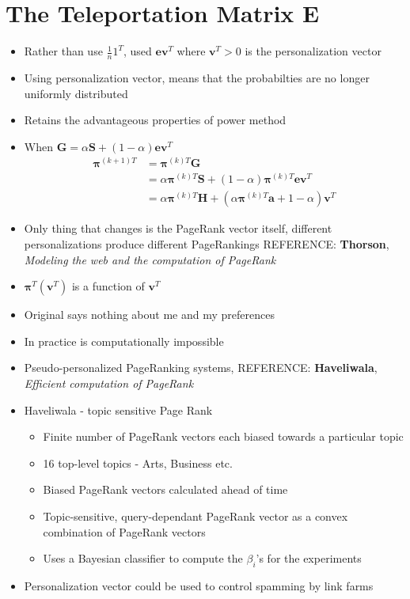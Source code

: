 \documentclass[11pt]{report}
\begin{document}
\section{The Teleportation Matrix E}
\begin{itemize}
\item Rather than use $\frac{1}{n}1^T$, used $\textbf{ev}^T$ where $\textbf{v}^T >0$ is the personalization vector
\item Using personalization vector, means that the probabilties are no longer uniformly distributed
\item Retains the advantageous properties of power method
\item When $\textbf{G} = \alpha\textbf{S}+(1-\alpha)\textbf{ev}^T$ \begin{equation}
\begin{split}
\boldsymbol{\pi}^{(k+1)T} &=\boldsymbol{\pi}^{(k)T}\textbf{G}\\
&=\alpha\boldsymbol{\pi}^{(k)T}\textbf{S} + (1-\alpha)\boldsymbol{\pi}^{(k)T}\textbf{ev}^T\\
&=\alpha\boldsymbol{\pi}^{(k)T}\textbf{H}+(\alpha\boldsymbol{\pi}^{(k)T}\textbf{a}+1-\alpha)\textbf{v}^T
\end{split}
\end{equation}
\item Only thing that changes is the PageRank vector itself, different personalizations produce different PageRankings REFERENCE: \textbf{Thorson}, \textit{Modeling the web and the computation of PageRank}
\item $\boldsymbol{\pi}^T(\textbf{v}^T)$ is a function of $\textbf{v}^T$
\item Original says nothing about me and my preferences
\item In practice is computationally impossible
\item Pseudo-personalized PageRanking systems, REFERENCE: \textbf{Haveliwala}, \textit{Efficient computation of PageRank}
\item Haveliwala - topic sensitive Page Rank
\begin{itemize}
\item Finite number of PageRank vectors each biased towards a particular topic
\item 16 top-level topics - Arts, Business etc.
\item Biased PageRank vectors calculated ahead of time
\item Topic-sensitive, query-dependant PageRank vector as a convex combination of PageRank vectors
\item Uses a Bayesian classifier to compute the $\beta_i$'s for the experiments
\end{itemize}
\item Personalization vector could be used to control spamming by link farms
\end{itemize}
\end{document}
